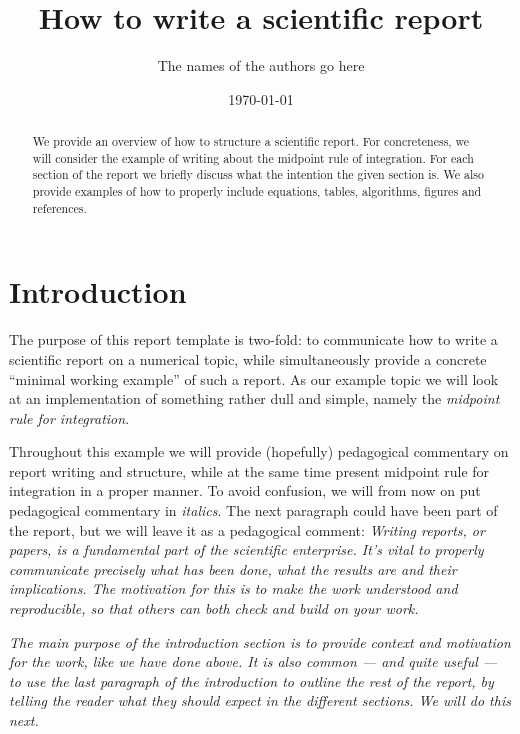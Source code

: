 \documentclass[english,notitlepage,reprint,nofootinbib]{revtex4-1}  %
\begin{document}
\title{How to write a scientific report}  %
\author{The names of the authors go here} %
\date{\today}                             %
\noaffiliation                            %

\begin{abstract}
    We provide an overview of how to structure a scientific report. For concreteness, we will consider the example of writing about the midpoint rule of integration. For each section of the report we briefly discuss what the intention the given section is. We also provide examples of how to properly include equations, tables, algorithms, figures and references.
\end{abstract}
\maketitle 


\section{Introduction}
%
The purpose of this report template is two-fold: to communicate how to write a scientific report on a numerical topic, while simultaneously provide a concrete ``minimal working example'' of such a report. As our example topic we will look at an implementation of something rather dull and simple, namely the \textit{midpoint rule for integration}. 

Throughout this example we will provide (hopefully) pedagogical commentary on report writing and structure, while at the same time present midpoint rule for integration in a proper manner. To avoid confusion, we will from now on put pedagogical commentary in \textit{italics}. The next paragraph could have been part of the report, but we will leave it as a pedagogical comment: \textit{Writing reports, or papers, is a fundamental part of the scientific enterprise. It's vital to properly communicate precisely what has been done, what the results are and their implications. The motivation for this is to make the work understood and reproducible, so that others can both check and build on your work.}

\textit{The main purpose of the introduction section is to provide context and motivation for the work, like we have done above. It is also common --- and quite useful --- to use the last paragraph of the introduction to outline the rest of the report, by telling the reader what they should expect in the different sections. We will do this next.}
\end{document}
